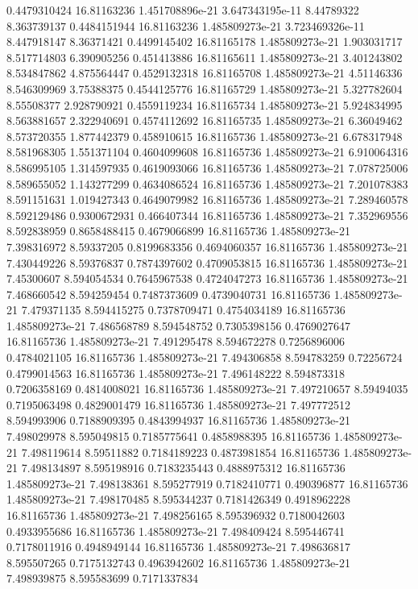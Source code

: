{0.4479310424 16.81163236 1.451708896e-21 3.647343195e-11 8.44789322 8.363739137
0.4484151944 16.81163236 1.485809273e-21 3.723469326e-11 8.447918147 8.36371421
0.4499145402 16.81165178 1.485809273e-21 1.903031717 8.517714803 6.390905256
0.451413886 16.81165611 1.485809273e-21 3.401243802 8.534847862 4.875564447
0.4529132318 16.81165708 1.485809273e-21 4.51146336 8.546309969 3.75388375
0.4544125776 16.81165729 1.485809273e-21 5.327782604 8.55508377 2.928790921
0.4559119234 16.81165734 1.485809273e-21 5.924834995 8.563881657 2.322940691
0.4574112692 16.81165735 1.485809273e-21 6.36049462 8.573720355 1.877442379
0.458910615 16.81165736 1.485809273e-21 6.678317948 8.581968305 1.551371104
0.4604099608 16.81165736 1.485809273e-21 6.910064316 8.586995105 1.314597935
0.4619093066 16.81165736 1.485809273e-21 7.078725006 8.589655052 1.143277299
0.4634086524 16.81165736 1.485809273e-21 7.201078383 8.591151631 1.019427343
0.4649079982 16.81165736 1.485809273e-21 7.289460578 8.592129486 0.9300672931
0.466407344 16.81165736 1.485809273e-21 7.352969556 8.592838959 0.8658488415
0.4679066899 16.81165736 1.485809273e-21 7.398316972 8.59337205 0.8199683356
0.4694060357 16.81165736 1.485809273e-21 7.430449226 8.59376837 0.7874397602
0.4709053815 16.81165736 1.485809273e-21 7.45300607 8.594054534 0.7645967538
0.4724047273 16.81165736 1.485809273e-21 7.468660542 8.594259454 0.7487373609
0.4739040731 16.81165736 1.485809273e-21 7.479371135 8.594415275 0.7378709471
0.4754034189 16.81165736 1.485809273e-21 7.486568789 8.594548752 0.7305398156
0.4769027647 16.81165736 1.485809273e-21 7.491295478 8.594672278 0.7256896006
0.4784021105 16.81165736 1.485809273e-21 7.494306858 8.594783259 0.72256724
0.4799014563 16.81165736 1.485809273e-21 7.496148222 8.594873318 0.7206358169
0.4814008021 16.81165736 1.485809273e-21 7.497210657 8.59494035 0.7195063498
0.4829001479 16.81165736 1.485809273e-21 7.497772512 8.594993906 0.7188909395
0.4843994937 16.81165736 1.485809273e-21 7.498029978 8.595049815 0.7185775641
0.4858988395 16.81165736 1.485809273e-21 7.498119614 8.59511882 0.7184189223
0.4873981854 16.81165736 1.485809273e-21 7.498134897 8.595198916 0.7183235443
0.4888975312 16.81165736 1.485809273e-21 7.498138361 8.595277919 0.7182410771
0.490396877 16.81165736 1.485809273e-21 7.498170485 8.595344237 0.7181426349
0.4918962228 16.81165736 1.485809273e-21 7.498256165 8.595396932 0.7180042603
0.4933955686 16.81165736 1.485809273e-21 7.498409424 8.595446741 0.7178011916
0.4948949144 16.81165736 1.485809273e-21 7.498636817 8.595507265 0.7175132743
0.4963942602 16.81165736 1.485809273e-21 7.498939875 8.595583699 0.7171337834
}
